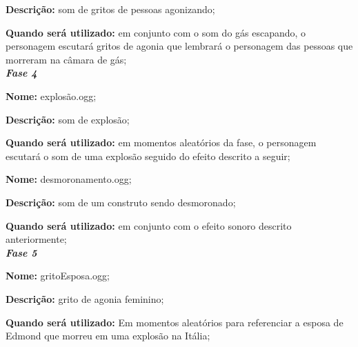 \begin{list}{}{}
\textbf{Descrição:} som de gritos de pessoas agonizando;

\textbf{Quando será utilizado:} em conjunto com o som do gás escapando, o personagem escutará gritos de agonia que lembrará o personagem das pessoas que morreram na câmara de gás; \\

\textbf{\textit{Fase 4}}
\item\textbf{Nome:} explosão.ogg;

\textbf{Descrição:} som de explosão;

\textbf{Quando será utilizado:} em momentos aleatórios da fase, o personagem escutará o som de uma explosão seguido do efeito descrito a seguir; \\

\item\textbf{Nome:} desmoronamento.ogg;

\textbf{Descrição:} som de um construto sendo desmoronado;

\textbf{Quando será utilizado:} em conjunto com o efeito sonoro descrito anteriormente; \\

\textbf{\textit{Fase 5}}
\item\textbf{Nome:} gritoEsposa.ogg;

\textbf{Descrição:} grito de agonia feminino;

\textbf{Quando será utilizado:} Em momentos aleatórios para referenciar a esposa de Edmond que morreu em uma explosão na Itália; \\

\end{list}